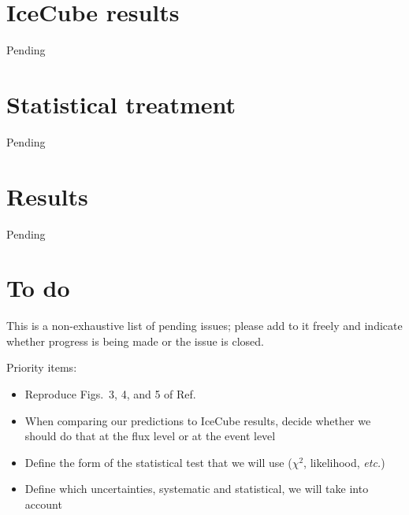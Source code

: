 \documentclass[aps,twocolumn,prd,showpacs,showkeys,preprintnumbers,superscriptaddress,nobibnotes,floatfix,longbibliography]{revtex4-1}
\newcommand{\etc}{{\it etc.}}
\newcommand{\Ref}{Ref.}
\begin{document}
\section{IceCube results}

Pending




\section{Statistical treatment}

Pending




\section{Results}

Pending




\section{To do}

This is a non-exhaustive list of pending issues; please add to it freely and indicate whether progress is being made or the issue is closed.
\smallskip

Priority items:
\begin{itemize}
 \item
  Reproduce Figs.\ 3, 4, and 5 of \Ref\ \cite{Ng:2014pca} \\
 \item
  When comparing our predictions to IceCube results, decide whether we should do that at the flux level or at the event level
 \item
  Define the form of the statistical test that we will use ($\chi^2$, likelihood, \etc)
 \item
  Define which uncertainties, systematic and statistical, we will take into account
\end{itemize}
\end{document}
